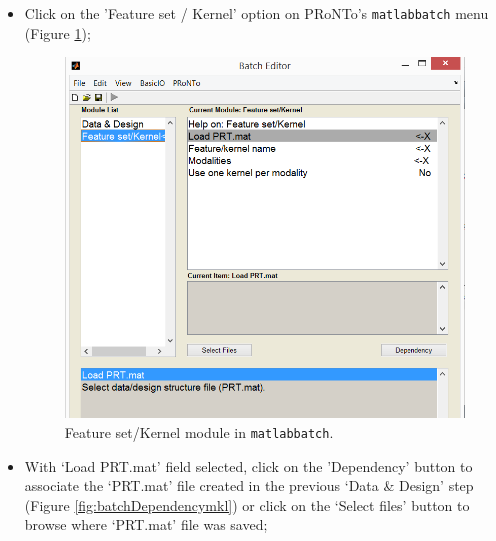 \begin{itemize}
	\item Click on the 'Feature set / Kernel' option on PRoNTo's {\tt matlabbatch} menu (Figure \ref{fig:batchFeaturemkl});
	
	\begin{figure}[!h]
	\centering
		\includegraphics[scale=0.6]{images/Tutorial/mkl/batchFeaturemkl.png}
	\caption{Feature set/Kernel module in {\tt matlabbatch}. }
	\label{fig:batchFeaturemkl}
\end{figure}
	
	\item With `Load PRT.mat' field selected, click on the 'Dependency' button to associate the `PRT.mat' file created in the previous `Data \& Design' step (Figure \ref{fig:batchDependencymkl}) or click on the `Select files' button to browse where `PRT.mat' file was saved;
	

\end{itemize}
